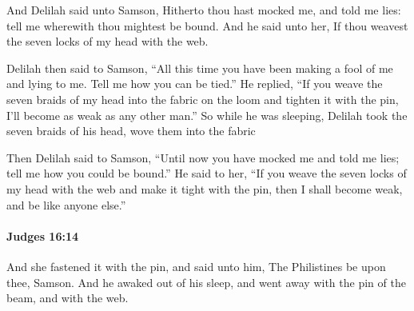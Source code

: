 			\begin{versebox}
					\item[BHS] 
					\item[ASV] And Delilah said unto Samson, Hitherto thou hast mocked me, and told me lies: tell me wherewith thou mightest be bound. And he said unto her, If thou weavest the seven locks of my head with the web.
					\item[NIV] Delilah then said to Samson, “All this time you have been making a fool of me and lying to me. Tell me how you can be tied.” He replied, “If you weave the seven braids of my head into the fabric on the loom and tighten it with the pin, I’ll become as weak as any other man.” So while he was sleeping, Delilah took the seven braids of his head, wove them into the fabric
					\item[NRSV] Then Delilah said to Samson, “Until now you have mocked me and told me lies; tell me how you could be bound.” He said to her, “If you weave the seven locks of my head with the web and make it tight with the pin, then I shall become weak, and be like anyone else.”
			\end{versebox}

		\paragraph{Judges 16:14} %
			\label{JUDGES-16-14}

			And she fastened it with the pin, and said unto him, The Philistines be upon thee, Samson. And he awaked out of his sleep, and went away with the pin of the beam, and with the web.

